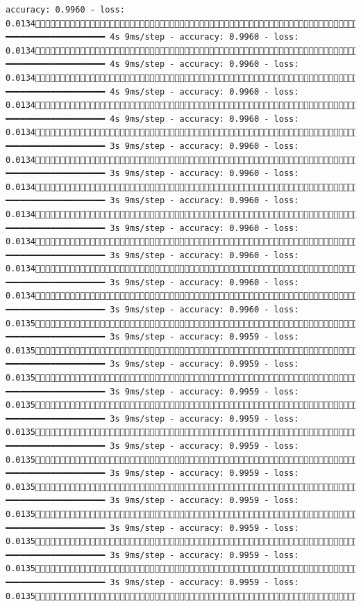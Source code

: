 \documentclass[
  letterpaper,
  DIV=11,
  numbers=noendperiod]{scrreprt}
\begin{document}
\begin{verbatim}
accuracy: 0.9960 - loss: 0.01341419/1875 ━━━━━━━━━━━━━━━━━━━━ 4s 9ms/step - accuracy: 0.9960 - loss: 0.01341425/1875 ━━━━━━━━━━━━━━━━━━━━ 4s 9ms/step - accuracy: 0.9960 - loss: 0.01341431/1875 ━━━━━━━━━━━━━━━━━━━━ 4s 9ms/step - accuracy: 0.9960 - loss: 0.01341437/1875 ━━━━━━━━━━━━━━━━━━━━ 4s 9ms/step - accuracy: 0.9960 - loss: 0.01341443/1875 ━━━━━━━━━━━━━━━━━━━━ 3s 9ms/step - accuracy: 0.9960 - loss: 0.01341450/1875 ━━━━━━━━━━━━━━━━━━━━ 3s 9ms/step - accuracy: 0.9960 - loss: 0.01341456/1875 ━━━━━━━━━━━━━━━━━━━━ 3s 9ms/step - accuracy: 0.9960 - loss: 0.01341462/1875 ━━━━━━━━━━━━━━━━━━━━ 3s 9ms/step - accuracy: 0.9960 - loss: 0.01341469/1875 ━━━━━━━━━━━━━━━━━━━━ 3s 9ms/step - accuracy: 0.9960 - loss: 0.01341476/1875 ━━━━━━━━━━━━━━━━━━━━ 3s 9ms/step - accuracy: 0.9960 - loss: 0.01341482/1875 ━━━━━━━━━━━━━━━━━━━━ 3s 9ms/step - accuracy: 0.9960 - loss: 0.01351488/1875 ━━━━━━━━━━━━━━━━━━━━ 3s 9ms/step - accuracy: 0.9959 - loss: 0.01351494/1875 ━━━━━━━━━━━━━━━━━━━━ 3s 9ms/step - accuracy: 0.9959 - loss: 0.01351500/1875 ━━━━━━━━━━━━━━━━━━━━ 3s 9ms/step - accuracy: 0.9959 - loss: 0.01351506/1875 ━━━━━━━━━━━━━━━━━━━━ 3s 9ms/step - accuracy: 0.9959 - loss: 0.01351512/1875 ━━━━━━━━━━━━━━━━━━━━ 3s 9ms/step - accuracy: 0.9959 - loss: 0.01351519/1875 ━━━━━━━━━━━━━━━━━━━━ 3s 9ms/step - accuracy: 0.9959 - loss: 0.01351526/1875 ━━━━━━━━━━━━━━━━━━━━ 3s 9ms/step - accuracy: 0.9959 - loss: 0.01351532/1875 ━━━━━━━━━━━━━━━━━━━━ 3s 9ms/step - accuracy: 0.9959 - loss: 0.01351538/1875 ━━━━━━━━━━━━━━━━━━━━ 3s 9ms/step - accuracy: 0.9959 - loss: 0.01351543/1875 ━━━━━━━━━━━━━━━━━━━━ 3s 9ms/step - accuracy: 0.9959 - loss: 0.01351549/1875 
\end{verbatim}
\end{document}
